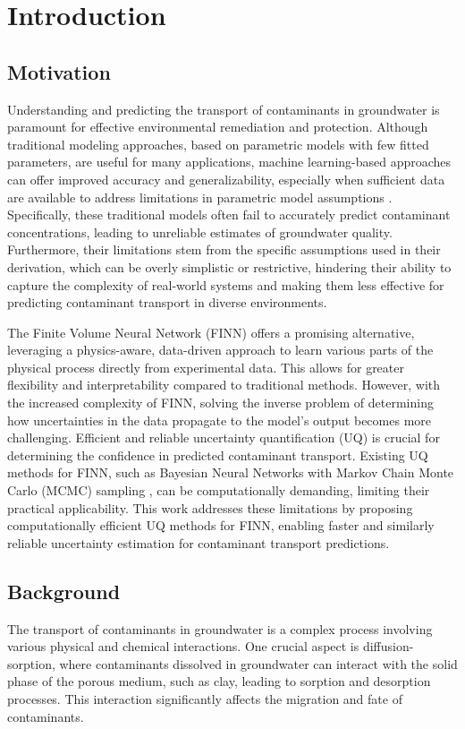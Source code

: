 \chapter{Introduction}

\section{Motivation}
Understanding and predicting the transport of contaminants in groundwater is paramount for effective environmental remediation and protection. Although traditional modeling approaches, based on parametric models with few fitted parameters, are useful for many applications, machine learning-based approaches can offer improved accuracy and generalizability, especially when sufficient data are available to address limitations in parametric model assumptions \cite{finn}. Specifically, these traditional models often fail to accurately predict contaminant concentrations, leading to unreliable estimates of groundwater quality. Furthermore, their limitations stem from the specific assumptions used in their derivation, which can be overly simplistic or restrictive, hindering their ability to capture the complexity of real-world systems and making them less effective for predicting contaminant transport in diverse environments.

The Finite Volume Neural Network (FINN) \cite{finn} offers a promising alternative, leveraging a physics-aware, data-driven approach to learn various parts of the physical process directly from experimental data. This allows for greater flexibility and interpretability compared to traditional methods. However, with the increased complexity of FINN, solving the inverse problem of determining how uncertainties in the data propagate to the model's output becomes more challenging. Efficient and reliable uncertainty quantification (UQ) is crucial for determining the confidence in predicted contaminant transport. Existing UQ methods for FINN, such as Bayesian Neural Networks with Markov Chain Monte Carlo (MCMC) sampling \cite{bardenet2017markov}, can be computationally demanding, limiting their practical applicability. This work addresses these limitations by proposing computationally efficient UQ methods for FINN, enabling faster and similarly reliable uncertainty estimation for contaminant transport predictions.


\section{Background}
The transport of contaminants in groundwater is a complex process involving various physical and chemical interactions. One crucial aspect is diffusion-sorption, where contaminants dissolved in groundwater can interact with the solid phase of the porous medium, such as clay, leading to sorption and desorption processes. This interaction significantly affects the migration and fate of contaminants.


